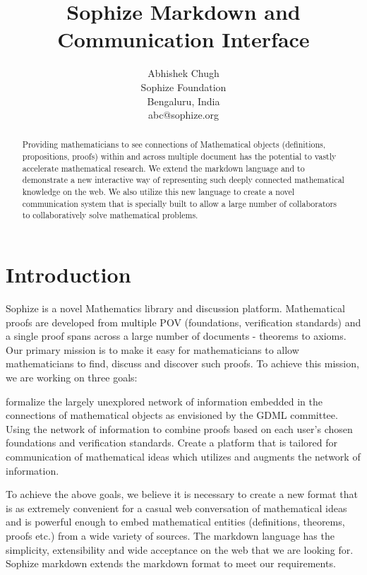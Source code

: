 \documentclass[a4paper]{article}
\title{Sophize Markdown and Communication Interface }
\author{
Abhishek Chugh \\ Sophize Foundation\\
                Bengaluru, India \\ abc@sophize.org
}
\begin{document}
\maketitle

\begin{abstract}
Providing mathematicians to see connections of Mathematical objects (definitions, propositions, proofs) within and across multiple document has the potential to vastly accelerate mathematical research. We extend the markdown language and to demonstrate a new interactive way of representing such deeply connected mathematical knowledge on the web. We also utilize this new language to create a novel communication system that is specially built to allow a large number of collaborators to collaboratively solve mathematical problems.
\end{abstract}
\vskip 32pt


\section{Introduction}

Sophize is a novel Mathematics library and discussion platform. Mathematical proofs are developed from multiple POV (foundations, verification standards) and a single proof spans across a large number of documents - theorems to axioms. Our primary mission is to make it easy for mathematicians to allow mathematicians to find, discuss and discover such proofs. To achieve this mission, we are working on three goals:

formalize the largely unexplored network of information embedded in the connections of mathematical objects as envisioned by the GDML committee.
Using the network of information to combine proofs based on each user’s chosen foundations and verification standards.
Create a platform that is tailored for communication of mathematical ideas which utilizes and augments the network of information.

To achieve the above goals, we believe it is necessary to create a new format that is as extremely convenient for a casual web conversation of mathematical ideas and is powerful enough to embed mathematical entities (definitions, theorems, proofs etc.) from a wide variety of sources. The markdown language has the simplicity, extensibility and wide acceptance on the web that we are looking for. Sophize markdown extends the markdown format to meet our requirements.
\end{document}
